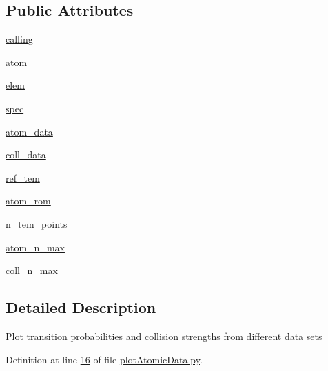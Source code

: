 \subsection*{Public Attributes}
\begin{DoxyCompactItemize}
\item 
\hyperlink{classpyneb_1_1plot_1_1plot_atomic_data_1_1_data_plot_a393a133b607541c57d5ebc5a34687e3f}{calling}
\item 
\hyperlink{classpyneb_1_1plot_1_1plot_atomic_data_1_1_data_plot_af5bbbf002544d1336f7f673a6e777f2e}{atom}
\item 
\hyperlink{classpyneb_1_1plot_1_1plot_atomic_data_1_1_data_plot_ae936c57b93cc86a5cf28f8838164940a}{elem}
\item 
\hyperlink{classpyneb_1_1plot_1_1plot_atomic_data_1_1_data_plot_acaaca83a6e12e99ebc1da72af5f8c60a}{spec}
\item 
\hyperlink{classpyneb_1_1plot_1_1plot_atomic_data_1_1_data_plot_aee33ad460a38cb4293a5bd89cec12294}{atom\-\_\-data}
\item 
\hyperlink{classpyneb_1_1plot_1_1plot_atomic_data_1_1_data_plot_a50a9af3695633a64c66d082ed67d1bfb}{coll\-\_\-data}
\item 
\hyperlink{classpyneb_1_1plot_1_1plot_atomic_data_1_1_data_plot_aa260990b7c3556dc48741f6ae9516894}{ref\-\_\-tem}
\item 
\hyperlink{classpyneb_1_1plot_1_1plot_atomic_data_1_1_data_plot_a334c448311ed9dc8cd700af504e06254}{atom\-\_\-rom}
\item 
\hyperlink{classpyneb_1_1plot_1_1plot_atomic_data_1_1_data_plot_a9f92ae121756c0e3d3624f11e3d2ae17}{n\-\_\-tem\-\_\-points}
\item 
\hyperlink{classpyneb_1_1plot_1_1plot_atomic_data_1_1_data_plot_a668572cfe9a684e7195535d60d343938}{atom\-\_\-n\-\_\-max}
\item 
\hyperlink{classpyneb_1_1plot_1_1plot_atomic_data_1_1_data_plot_aa15b01aa8da5eac903d797c2a1af3461}{coll\-\_\-n\-\_\-max}
\end{DoxyCompactItemize}


\subsection{Detailed Description}
\begin{DoxyVerb}Plot transition probabilities and collision strengths from different data sets\end{DoxyVerb}
 

Definition at line \hyperlink{plot_atomic_data_8py_source_l00016}{16} of file \hyperlink{plot_atomic_data_8py_source}{plot\-Atomic\-Data.\-py}.



